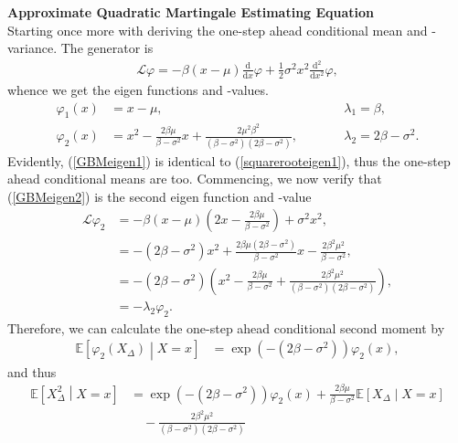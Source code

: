 \noindent \textbf{Approximate Quadratic Martingale Estimating Equation}\\
\noindent Starting once more with deriving the one-step ahead conditional mean and - variance. The generator is
\begin{align}
    \mathcal{L}\varphi = -\beta\left(x - \mu\right)\frac{\mathrm{d}}{\mathrm{d}x}\varphi + \frac{1}{2}\sigma^2 x^2 \frac{\mathrm{d}^2}{\mathrm{d}x^2}\varphi,
\end{align}
whence we get the eigen functions and -values.
\begin{align}
    \varphi_1(x) &= x - \mu, \qquad &&\lambda_1 = \beta, \label{GBMeigen1} \\
    \varphi_2(x) &= x^2 - \frac{2\beta\mu}{\beta - \sigma^2}x + \frac{2\mu^2\beta^2}{\left(\beta - \sigma^2\right)\left(2\beta - \sigma^2\right)}, \qquad &&\lambda_2 = 2\beta - \sigma^2 \label{GBMeigen2}.
\end{align}
Evidently, (\ref{GBMeigen1}) is identical to (\ref{squarerooteigen1}), thus the one-step ahead conditional means are too. Commencing, we now verify that (\ref{GBMeigen2}) is the second eigen function and -value
\begin{align}
    \mathcal{L}\varphi_2 & = -\beta\left(x-\mu\right)\left(2x - \frac{2\beta\mu}{\beta-\sigma^2}\right) + \sigma^2x^2,\\
    &=-\left(2\beta - \sigma^2\right)x^2 + \frac{2\beta\mu\left(2\beta-\sigma^2\right)}{\beta - \sigma^2}x - \frac{2\beta^2\mu^2}{\beta - \sigma^2}, \\
    &= -\left(2\beta -\sigma^2\right)\left(x^2 - \frac{2\beta\mu}{\beta-\sigma^2} + \frac{2\beta^2\mu^2}{\left(\beta-\sigma^2\right)\left(2\beta-\sigma^2\right)}\right),\\
    &= - \lambda_2 \varphi_2.
\end{align}
Therefore, we can calculate the one-step ahead conditional second moment by
\begin{align}
    \mathbb{E}\left[\varphi_2(X_\Delta)\middle|X = x\right] &= \exp\left(-\left(2\beta - \sigma^2\right)\right)\varphi_2(x),
\end{align}
and thus
\begin{align}
    \mathbb{E}\left[X_\Delta^2 \middle| X = x\right] &= \exp\left(-\left(2\beta - \sigma^2\right)\right)\varphi_2(x) + \frac{2\beta\mu}{\beta-\sigma^2} \mathbb{E}\left[X_\Delta\middle|X=x\right] \nonumber \\
    &\quad - \frac{2\beta^2\mu^2}{\left(\beta-\sigma^2\right)\left(2\beta-\sigma^2\right)} \label{GBM_secondmoment}
\end{align}
